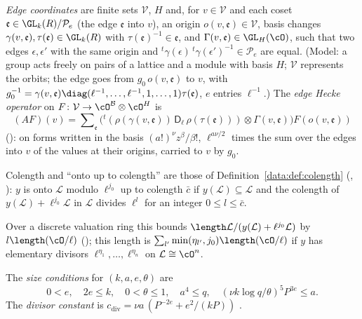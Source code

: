 \begin{definition}
\label{ub-eldiv:def:operator}
\emph{Edge coordinates} are finite sets $\mathcal V$, $H$ and, for $v\in\mathcal V$ and each coset
$\mathfrak e\in\GL_k(R)/\mathcal P_e$ (the edge $\mathfrak e$ into $v$), an origin
$o(v,\mathfrak e)\in\mathcal V$, basis changes $\gamma(v,\mathfrak e),\tau(\mathfrak e)\in\GL_k(R)$
with $\tau(\mathfrak e)^{-1}\in\mathfrak e$, and $\Gamma(v,\mathfrak e)\in\GL_H(\cO)$, such that two
edges $\epsilon,\epsilon'$ with the same origin and ${}^t\gamma(\epsilon)\,{}^t\gamma(\epsilon')^{-1}
\in\mathcal P_e$ are equal. (Model: a group acts freely on pairs of a lattice and a module with basis
$H$; $\mathcal V$ represents the orbits; the edge goes from $g_0\,o(v,\mathfrak e)$ to $v$, with
$g_0^{-1}=\gamma(v,\mathfrak e)\diag(\ell^{-1},\dots,\ell^{-1},1,\dots,1)\tau(\mathfrak e)$, $e$ entries
$\ell^{-1}$.) The \emph{edge Hecke operator} on $F\colon\mathcal V\to\cO^{\mathcal B}\otimes\cO^H$ is
\[
  (AF)(v)=\sum\nolimits_{\mathfrak e}\bigl({}^t(\rho(\gamma(v,\mathfrak e))\,\mathsf D_\ell\,
  \rho(\tau(\mathfrak e)))\otimes\Gamma(v,\mathfrak e)\bigr)F(o(v,\mathfrak e))
\]
(): on forms written in the basis
$(a!)^\nu z^\beta/\beta!$, $\ell^{a\nu/2}$ times the sum over the edges into $v$ of the values at their
origins, carried to $v$ by $g_0$.
\end{definition}

Colength and ``onto up to colength'' are those of Definition~\ref{data:def:colength}
(, ): $y$ is onto $\mathcal L$ modulo $\ell^{j_0}$
up to colength $\bar c$ if $y(\mathcal L)\subseteq\mathcal L$ and the colength of
$y(\mathcal L)+\ell^{j_0}\mathcal L$ in $\mathcal L$ divides $\ell^l$ for an integer $0\le l\le\bar c$.

Over a discrete valuation ring this bounds $\length\mathcal L/(y(\mathcal L)+\ell^{j_0}\mathcal L)$ by
$l\length(\cO/\ell)$ (); this length is
$\sum_{l'}\min(\eta_{l'},j_0)\length(\cO/\ell)$ if $y$ has elementary divisors
$\ell^{\eta_1},\dots,\ell^{\eta_n}$ on $\mathcal L\cong\cO^n$.

\begin{definition}\label{ub-eldiv:def:large}
The \emph{size conditions} for $(k,a,e,\theta)$ are
\begin{equation}\label{ub-eldiv:eq:large}
  0<e,\quad 2e\le k,\quad 0<\theta\le1,\quad a^4\le q,\quad
  (\nu k\log q/\theta)^5P^{3e}\le a .
\end{equation}
The \emph{divisor constant} is $c_{\mathrm{div}}=\nu a\,(P^{-2e}+e^2/(kP))$
.
\end{definition}

